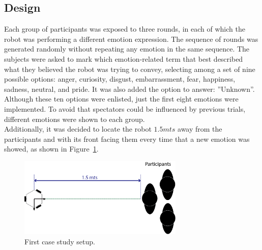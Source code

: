 \subsection{Design}
Each group of participants was exposed to three rounds, in each of which the robot was performing a different emotion expression. The sequence of rounds was generated randomly without repeating any emotion in the same sequence. The subjects were asked to mark which emotion-related term that best described what they believed the robot was trying to convey, selecting among a set of nine possible options: anger, curiosity, disgust, embarrassment, fear, happiness, sadness, neutral, and pride. It was also added the option to answer: ''Unknown''. Although these ten options were enlisted, just the first eight emotions were implemented. To avoid that spectators could be influenced by previous trials, different emotions were shown to each group.\\
Additionally, it was decided to locate the robot $1.5 mts$ away from the participants and with its front facing them every time that a new emotion was showed, as shown in  Figure~\ref{fig:setup}. 
\begin{figure}
	\centering
	\includegraphics[width=0.7\textwidth]{./Images/FirstCase.png} 
	\caption{First case study setup.}
	\label{fig:setup}
\end{figure}  
